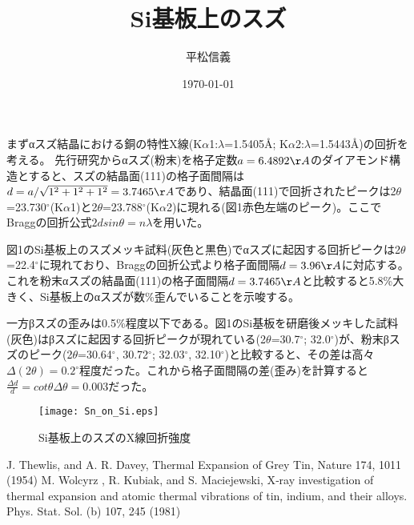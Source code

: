 \documentclass[11pt,a4paper]{jsarticle}
\title{Si基板上のスズ}
\author{平松信義}
\date{\today}
\begin{document}
\maketitle

まずαスズ結晶における銅の特性X線(K$\alpha$1:$\lambda$=1.5405\AA; K$\alpha$2:$\lambda$=1.5443\AA)の回折を考える。
先行研究\cite{gray}からαスズ(粉末)を格子定数$a=6.4892\AA$のダイアモンド構造とすると、スズの結晶面(111)の格子面間隔は$d=a/\sqrt{1^2+1^2+1^2}=3.7465\AA$であり、結晶面(111)で回折されたピークは2$\theta$=23.730$^\circ$(K$\alpha$1)と2$\theta$=23.788$^\circ$(K$\alpha$2)に現れる(図1赤色左端のピーク)。ここでBraggの回折公式$2dsin\theta=n\lambda$を用いた。

図1のSi基板上のスズメッキ試料(灰色と黒色)でαスズに起因する回折ピークは2$\theta$=22.4$^\circ$に現れており、Braggの回折公式より格子面間隔$d=3.96\AA$に対応する。これを粉末αスズの結晶面(111)の格子面間隔$d=3.7465\AA$と比較すると5.8\%大きく、Si基板上のαスズが数\%歪んでいることを示唆する。

一方βスズの歪みは0.5\%程度以下である。図1のSi基板を研磨後メッキした試料(灰色)はβスズに起因する回折ピークが現れている(2$\theta$=30.7$^\circ$; 32.0$^\circ$)が、粉末βスズのピーク(2$\theta$=30.64$^\circ$, 30.72$^\circ$; 32.03$^\circ$, 32.10$^\circ$)\cite{white}と比較すると、その差は高々$\Delta(2\theta)=0.2^\circ$程度だった。これから格子面間隔の差(歪み)を計算すると$\frac{\Delta d}{d}=cot\theta \Delta\theta= 0.003$だった。

\begin{figure}[!h]
    \begin{center}
   \texttt{[image: Sn\_on\_Si.eps]}
  \end{center}
  \caption{Si基板上のスズのX線回折強度}
  \label{fig:Sn_on_Si}
\end{figure}



\begin{thebibliography}{9}
 J. Thewlis, and A. R. Davey,  Thermal Expansion of Grey Tin, Nature 174, 1011 (1954)  
M. Wolcyrz , R.  Kubiak, and S. Maciejewski, X‐ray investigation of thermal expansion and atomic thermal vibrations of tin, indium, and their alloys. Phys. Stat. Sol. (b) 107,  245 (1981)
\end{thebibliography}
\end{document}
